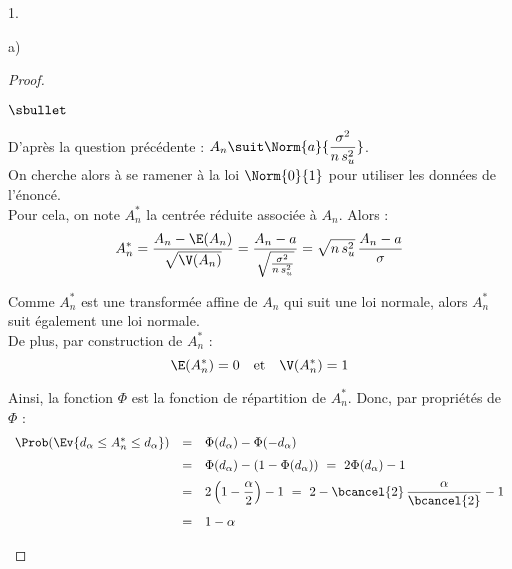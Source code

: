 \documentclass[11pt]{article}%
\begin{document}
\begin{noliste}{1.}
\begin{noliste}{a)}
  \begin{proof}~
   \begin{noliste}{$\sbullet$}
    \item D'après la question précédente : $A_n \suit 
    \Norm{a}{\dfrac{\sigma^2}{n \, s_u^2}}$.\\
    On cherche alors à se ramener à la loi $\Norm{0}{1}$ pour 
    utiliser les données de l'énoncé.\\
    Pour cela, on note $A_n^*$ la \var centrée réduite associée à 
    $A_n$. Alors :
    \[
     A_n^* = \dfrac{A_n - \E(A_n)}{\sqrt{\V(A_n)}} = 
     \dfrac{A_n -a}{\sqrt{\frac{\sigma^2}{n \, s_u^2}}}
     = \sqrt{n \, s_u^2} \, \dfrac{A_n - a}{\sigma}
    \]
    
    \item Comme $A_n^*$ est une transformée affine de $A_n$ qui suit
    une loi normale, alors $A_n^*$ suit également une loi normale.\\
    De plus, par construction de $A_n^*$ :
    \[
     \E(A_n^*)=0 \quad \mbox{et} \quad \V(A_n^*)=1 
    \]
    
    \item Ainsi, la fonction $\Phi$ est la fonction de répartition 
    de $A_n^*$. Donc, par propriétés de $\Phi$ :
    \[
     \begin{array}{rcl}
      \Prob(\Ev{d_\alpha \leq A_n^* \leq d_\alpha}) &=& 
      \Phi(d_\alpha) - \Phi(-d_\alpha)
      \\[.2cm]
      &=& \Phi(d_\alpha) -(1- \Phi(d_\alpha)) \ = \
      2 \Phi(d_\alpha) -1
      \\[.2cm]
      &=& 2\left(1- \dfrac{\alpha}{2}\right) -1 \ = \
      2 - \bcancel{2} \, \dfrac{\alpha}{\bcancel{2}} -1
      \\[.4cm]
      &=& 1 - \alpha
     \end{array}
    \]
       

\end{noliste}
\end{proof}
\end{noliste}
\end{noliste}
\end{document}
